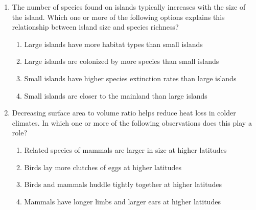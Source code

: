 \documentclass[journal]{IEEEtran}
\begin{document}
\begin{enumerate}
    \item The number of species found on islands typically increases with the size of the island.
Which one or more of the following options explains this relationship between island size and species richness?
\begin{enumerate}
        \item Large islands have more habitat types than small islands
        \item Large islands are colonized by more species than small islands
        \item Small islands have higher species extinction rates than large islands
        \item Small islands are closer to the mainland than large islands
    \end{enumerate}
    
    \item Decreasing surface area to volume ratio helps reduce heat loss in colder climates.
In which one or more of the following observations does this play a role?
\begin{enumerate}
        \item Related species of mammals are larger in size at higher latitudes
        \item Birds lay more clutches of eggs at higher latitudes
        \item Birds and mammals huddle tightly together at higher latitudes
        \item Mammals have longer limbs and larger ears at higher latitudes
    \end{enumerate}
    

\end{enumerate}
\end{document}

